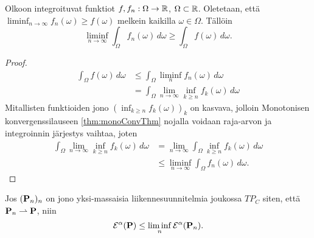 \documentclass[12pt,oneside,a4paper]{amsbook} %
\begin{document}
\begin{lemma}\label{le:intRFctLSC} 
    Olkoon integroituvat funktiot $f, f_n : \Omega \to \R$, $\Omega \subset \R$. Oletetaan, että $\displaystyle \liminf_{n\to\infty} f_n(\omega) \ge f(\omega)$ melkein kaikilla $\omega \in \Omega$. Tällöin
        \begin{equation*}
            \liminf_{n\to \infty} \int_\Omega f_n(\omega) \, d\omega \ge \int_\Omega f(\omega)\, d\omega.
        \end{equation*}
\end{lemma}
\begin{proof}
    \begin{align*}
        \int_\Omega f(\omega) \, d\omega &\le \int_\Omega \liminf_n f_n(\omega) \, d\omega \\
        & = \int_\Omega \lim_{n\to\infty} \inf_{k\ge n} f_k(\omega) \, d\omega
    \end{align*}
 Mitallisten funktioiden jono $(\inf_{k\ge n}f_k(\omega))_k$ on kasvava, jolloin Monotonisen konvergenssilauseen \ref{thm:monoConvThm} nojalla voidaan raja-arvon ja integroinnin järjestys vaihtaa, joten
    \begin{align*}
         \int_\Omega \lim_{n\to\infty} \inf_{k\ge n} f_k(\omega) \, d\omega &= \lim_{n\to\infty} \int_\Omega \inf_{k\ge n} f_k(\omega) \, d\omega \\
        &\le  \liminf_{n\to\infty} \int_\Omega f_n(\omega) \, d\omega. 
    \end{align*}
\end{proof}

\begin{theorem}\label{thm:energyLSC}
    Jos $(\P_n)_n$ on jono yksi-massaisia liikennesuunnitelmia joukossa $TP_C$ siten, että $\P_n \rightharpoonup \P$, niin
        \begin{equation*}
            \E^\alpha(\P) \le \liminf_n \E^\alpha(\P_n).
        \end{equation*}
\end{theorem}
\end{document}
